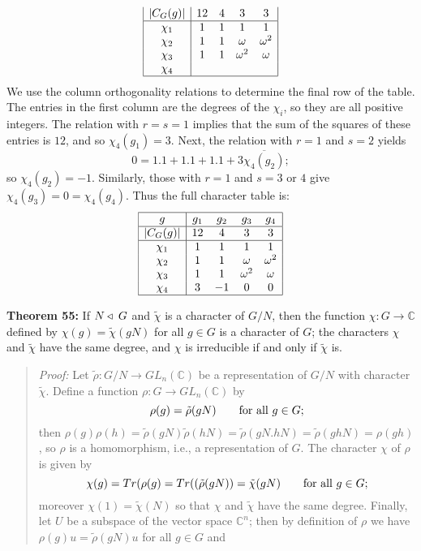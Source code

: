 {\begin{itemize}
$$\begin{array}{|c|cccc|}
|C_G(g)|&12&4&3&3\\
\hline
\chi_1&1&1&1&1\\
\chi_2&1&1&\omega&\omega^2\\
\chi_3&1&1&\omega^2&\omega\\
\chi_4&&&&\\
\hline
\end{array}
$$
We use the column orthogonality relations to determine the
final row of the table. The entries in the first column are the degrees of
the $\chi_i$, so they are all positive integers.  The relation
with $r=s=1$ implies that the sum of the squares of these entries is $12$, and
so $\chi_4(g_1)=3$. Next, the relation with $r=1$ and $s=2$ yields
$$0=1.1+1.1+1.1+3\overline{\chi_4(g_2)};$$
so $\chi_4(g_2)=-1$. Similarly, those with $r=1$ and $s=3$ or $4$ give
$\chi_4(g_3)=0=\chi_4(g_4)$. Thus the full character table is:
$$
\begin{array}{|c|cccc|}
\hline
g&g_1&g_2&g_3&g_4\\
\hline
|C_G(g)|&12&4&3&3\\
\hline
\chi_1&1&1&1&1\\
\chi_2&1&1&\omega&\omega^2\\
\chi_3&1&1&\omega^2&\omega\\
\chi_4&3&-1&0&0\\
\hline
\end{array}
$$
\end{itemize}
{\bf Theorem 55:} If $N\triangleleft\; G$ and $\tilde\chi$ is a character
of $G/N$, then the function $\chi:G\rightarrow{\mathbb C}$ defined by
$\chi(g)=\tilde\chi(gN)$ for all $g\in G$ is a character of $G$; the characters
$\chi$ and $\tilde\chi$ have the same degree, and $\chi$ is irreducible if and
only if $\tilde\chi$ is.
\begin{quote}
\emph{Proof:}
Let $\tilde\rho:G/N\rightarrow GL_n({\mathbb C})$ be a representation of $G/N$ with
character $\tilde\chi$. Define a function $\rho:G\rightarrow GL_n({\mathbb C})$ by
$$\rho(g)=\tilde\rho(gN)\qquad\hbox{for all }g\in G;$$
then $\rho(g)\rho(h)=\tilde\rho(gN)\tilde\rho(hN)=\tilde\rho(gN.hN)
=\tilde\rho(ghN)=\rho(gh)$, so $\rho$ is a homomorphism, i.e., a representation
of $G$. The character $\chi$ of $\rho$ is given by
$$\chi(g)=Tr(\rho(g)=Tr((\tilde\rho(gN))=\tilde\chi(gN)\qquad\hbox{for all }
g\in G;$$
moreover $\chi(1)=\tilde\chi(N)$ so that $\chi$ and $\tilde\chi$ have the
same degree. Finally, let $U$ be a subspace of the vector space ${\mathbb C}^n$; then by
definition of $\rho$ we have $\rho(g)u=\tilde\rho(gN)u$ for all $g\in G$ and

\end{quote}}
